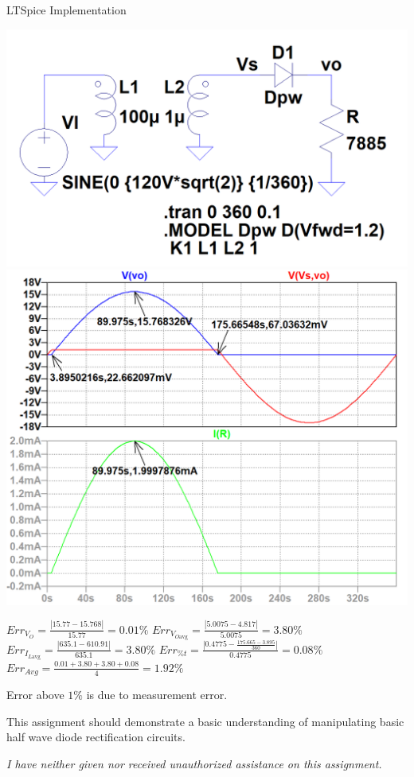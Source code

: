 \documentclass[12pt,letterpaper,titlepage]{article}
\begin{document}
\begin{raggedright}
\begin{center}
LTSpice Implementation

\includegraphics[width=.4\textwidth, height=\textheight, keepaspectratio=true]{ds2b}
\includegraphics[width=.49\textwidth, height=\textheight, keepaspectratio=true]{ds2c}
\begin{paracol}{2}
$Err_{V_O} = \frac{|15.77-15.768|}{15.77} = 0.01\%$
\switchcolumn
$Err_{V_{O \text{avg}}} = \frac{|5.0075-4.817|}{5.0075} = 3.80\%$
\switchcolumn
$Err_{I_{L \text{avg}}} = \frac{|635.1-610.91|}{635.1} = 3.80\%$
\switchcolumn
$Err_{\%t} = \frac{|0.4775-\frac{175.665 - 3.895}{360}|}{0.4775} = 0.08\%$
\switchcolumn
$Err_{Avg} = \frac{0.01 + 3.80 + 3.80 + 0.08}{4} = 1.92\%$
\end{paracol}
Error above $1\%$ is due to measurement error.
\end{center}

This assignment should demonstrate a basic understanding of manipulating basic half wave diode rectification circuits.

\textit{I have neither given nor received unauthorized assistance on this assignment.}


\end{raggedright}
\end{document}
